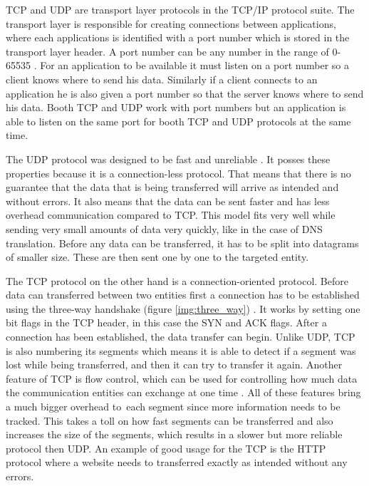 TCP and UDP are transport layer protocols in the TCP/IP protocol suite. The transport layer is responsible for creating connections between applications, where each applications is identified with a port number which is stored in the transport layer header. A port number can be any number in the range of 0-65535 \cite{Forouzan2010}. For an application to be available it must listen on a port number so a client knows where to send his data. Similarly if a client connects to an application he is also given a port number so that the server knows where to send his data. Booth TCP and UDP work with port numbers but an application is able to listen on the same port for booth TCP and UDP protocols at the same time.

The UDP protocol was designed to be fast and unreliable \cite{Forouzan2010}. It posses these properties because it is a connection-less protocol. That means that there is no guarantee that the data that is being transferred will arrive as intended and without errors. It also means that the data can be sent faster and has less overhead communication compared to TCP. This model fits very well while sending very small amounts of data very quickly, like in the case of DNS translation. Before any data can be transferred, it has to be split into datagrams of smaller size. These are then sent one by one to the targeted entity.

The TCP protocol on the other hand is a connection-oriented protocol. Before data can transferred between two entities first a connection has to be established using the three-way handshake (figure \ref{img:three_way}) \cite{Forouzan2010}. It works by setting one bit flags in the TCP header, in this case the SYN and ACK flags. After a connection has been established, the data transfer can begin. Unlike UDP, TCP is also numbering its segments which means it is able to detect if a segment was lost while being transferred, and then it can try to transfer it again. Another feature of TCP is flow control, which can be used for controlling how much data the communication entities can exchange at one time \cite{Forouzan2010}. All of these features bring a much bigger overhead to~each segment since more information needs to be tracked. This takes a toll on how fast segments can be transferred and also increases the size of the segments, which results in a slower but more reliable protocol then UDP. An example of good usage for the TCP is the HTTP protocol where a website needs to transferred exactly as intended without any errors.

